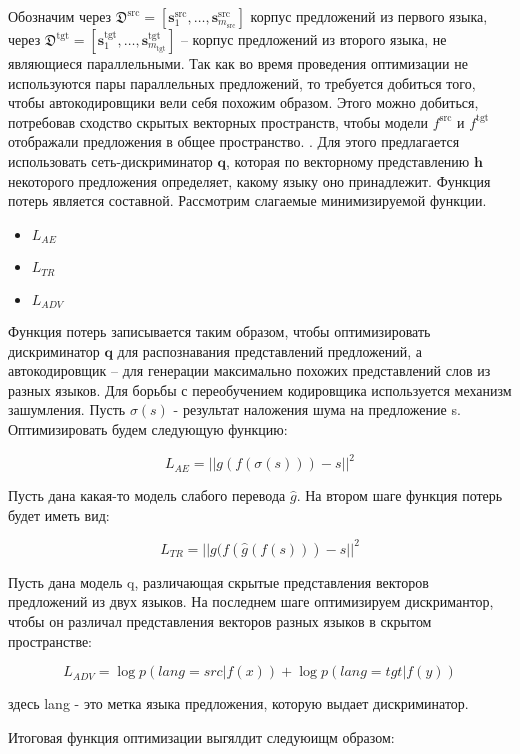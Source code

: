\documentclass[12pt,twoside]{article}
\begin{document}
Обозначим через $\mathfrak{D}^{\text{src}} = [\mathbf{s}_1^{\text{src}}, \dots, \mathbf{s}_{m_\text{src}}^{\text{src}}]$ корпус предложений из первого языка, через $\mathfrak{D}^{\text{tgt}} = [\mathbf{s}_1^{\text{tgt}}, \dots, \mathbf{s}_{m_\text{tgt}}^{\text{tgt}}]$ -- корпус предложений из второго языка, не являющиеся параллельными. Так как во время проведения оптимизации не используются пары параллельных предложений, то требуется добиться того, чтобы автокодировщики вели себя похожим образом. Этого можно добиться, потребовав сходство скрытых векторных пространств, чтобы модели $f^{\text{src}}$  и $f^{\text{tgt}}$ отображали предложения в общее пространство.
. Для этого предлагается использовать сеть-дискриминатор $\mathbf{q}$, которая по векторному представлению $\mathbf{h}$ некоторого предложения определяет, какому языку оно принадлежит. Функция потерь является составной. Рассмотрим слагаемые минимизируемой функции.\begin{itemize}
\item $L_{AE}$
\item $L_{TR}$
\item $L_{ADV}$
\end{itemize}
 Функция потерь записывается таким образом, чтобы оптимизировать дискриминатор $\mathbf{q}$ для распознавания представлений предложений, а автокодировщик -- для генерации максимально похожих представлений слов из разных языков. Для борьбы с переобучением кодировщика используется механизм зашумления. Пусть $\sigma(s)$ - результат наложения шума на предложение s.  Оптимизировать будем  следующую функцию:

$$L_{AE} = ||g(f(\sigma(s)))-s||^2$$

Пусть дана какая-то модель слабого перевода $\hat{g}$. На втором шаге  функция потерь будет иметь вид:

$$L_{TR} = ||g(f(\hat{g}(f(s))) - s||^2$$

Пусть дана модель q, различающая скрытые представления векторов предложений из двух языков. На последнем шаге оптимизируем дискримантор, чтобы он различал представления векторов разных языков в скрытом пространстве:

$$L_{ADV} = \log p(lang = src| f(x)) + \log p(lang = tgt|f(y))$$

здесь lang - это метка языка предложения, которую выдает дискриминатор.
 	
\vspace{\baselineskip}
Итоговая функция оптимизации выгялдит следуюищм образом:
\end{document}
